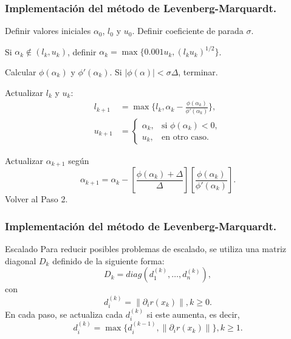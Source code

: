 \documentclass{beamer}
\newcommand{\norm}[1]{\left\lVert#1\right\rVert}
\begin{document}
\begin{frame}
    \frametitle{Implementación del método de Levenberg-Marquardt.}
    \begin{steps}
        \item Definir valores iniciales $\alpha_0$, $l_0$ y $u_0$. Definir coeficiente de parada $\sigma$.
        \item Si $\alpha_k \notin (l_k, u_k)$, definir $\alpha_k = \max \{0.001u_k, (l_ku_k)^{1/2}\}$.	
        \item Calcular $\phi(\alpha_k)$ y $\phi'(\alpha_k)$. Si $|\phi(\alpha)|<\sigma\Delta$, terminar.
        \item Actualizar $l_k$ y $u_k$:
            \begin{align*}
                l_{k+1} &= \max \{l_k, \alpha_k-\frac{\phi(\alpha_k)}{\phi'(\alpha_k)}\}, \\
                u_{k+1} &= \begin{cases}
                    \alpha_k, & \text{si } \phi(\alpha_k) < 0, \\
                    u_k, & \text{en otro caso}.
                \end{cases}
            \end{align*}
        \item Actualizar $\alpha_{k+1}$ según
        \begin{equation*}
            \alpha_{k+1} = \alpha_k - \left[\frac{\phi(\alpha_k)+\Delta}{\Delta}\right]
                            \left[\frac{\phi(\alpha_k)}{\phi'(\alpha_k)}\right].
        \end{equation*}
        Volver al Paso 2.
    \end{steps}
\end{frame}

\begin{frame}
    \frametitle{Implementación del método de Levenberg-Marquardt.}
    \begin{block}{Escalado}
        Para reducir posibles problemas de escalado, se utiliza una matriz diagonal $D_k$ definido de la siguiente forma:
        \begin{equation*}
            D_k = diag(d_1^{(k)}, \ldots, d_n^{(k)}),
        \end{equation*}
        con
        \begin{equation*}
            d_i^{(k)}=\norm{\partial_ir(x_k)}, k\geq 0.
        \end{equation*}
        En cada paso, se actualiza cada $d_i^{(k)}$ si este aumenta, es decir,
        \begin{equation*}
            d_i^{(k)} = \max \{d_i^{(k-1)}, \norm{\partial_ir(x_k)}\}, k\geq 1.
        \end{equation*}
    \end{block}
\end{frame}
\end{document}
